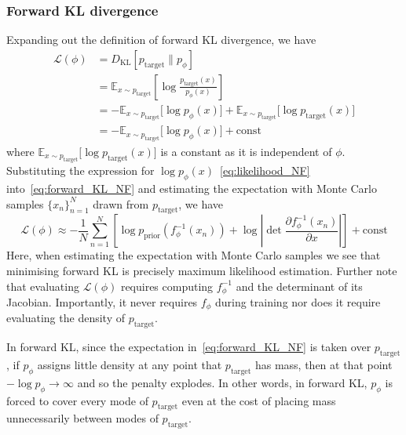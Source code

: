 \documentclass[12pt,a4paper]{report}
\begin{document}
\subsubsection{Forward KL divergence}
Expanding out the definition of forward KL divergence, we have
\begin{align}
\mathcal{L}(\phi) &= D_{\mathrm{KL}} [ p_{\text{target}} \parallel p_\phi ] \nonumber \\
&= \mathbb{E}_{x \sim p_{\text{target}}} \left[ \log \frac{p_{\text{target}}(x)}{p_\phi(x)} \right] \nonumber \\
&= -\mathbb{E}_{x \sim p_{\text{target}}} \big[ \log p_\phi(x) \big] + \mathbb{E}_{x \sim p_{\text{target}}} \big[ \log p_{\text{target}}(x) \big] \nonumber \\
&= -\mathbb{E}_{x \sim p_{\text{target}}} \big[ \log p_\phi(x) \big] + \text{const} \label{eq:forward_KL_NF}
\end{align}
where $\mathbb{E}_{x \sim p_{\text{target}}} \big[ \log p_{\text{target}}(x) \big] $ is a constant as it is independent of $\phi$. Substituting the expression for $\log p_\phi(x)$~\ref{eq:likelihood_NF} into~\ref{eq:forward_KL_NF} and estimating the expectation with Monte Carlo samples $\{x_n\}_{n=1}^N$ drawn from $p_\text{target}$, we have 
$$ \mathcal{L}(\phi) \approx -\frac{1}{N} \sum_{n=1}^{N} \left[ \log p_{\text{prior}}(f_\phi^{-1}(x_n)) + \log \left| \det \frac{\partial f_\phi^{-1}(x_n)}{\partial x} \right| \right] + \text{const} $$
Here, when estimating the expectation with Monte Carlo samples we see that minimising forward KL is precisely maximum likelihood estimation. Further note that evaluating $\mathcal{L}(\phi)$ requires computing $f^{-1}_\phi$ and the determinant of its Jacobian. Importantly, it never requires $f_\phi$ during training nor does it require evaluating the density of $p_\text{target}$. 

In forward KL, since the expectation in~\ref{eq:forward_KL_NF} is taken over $p_\text{target}$, if $p_\phi$ assigns little density at any point that $p_\text{target}$ has mass, then at that point $-\log p_\phi \rightarrow \infty$ and so the penalty explodes. In other words, in forward KL, $p_\phi$ is forced to cover every mode of $p_\text{target}$ even at the cost of placing mass unnecessarily between modes of $p_\text{target}$. 
\end{document}

